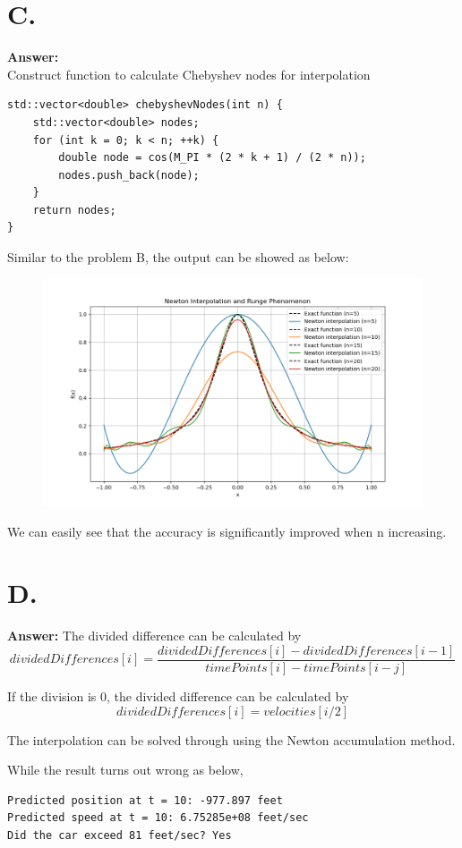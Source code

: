 \documentclass{article}
\begin{document}
\begin{CJK}{UTF8}{gbsn}
\section*{C.}
\textbf{Answer: }\\
Construct function to calculate Chebyshev nodes for interpolation
\begin{verbatim}
std::vector<double> chebyshevNodes(int n) {
    std::vector<double> nodes;
    for (int k = 0; k < n; ++k) {
        double node = cos(M_PI * (2 * k + 1) / (2 * n));
        nodes.push_back(node);
    }
    return nodes;
}
\end{verbatim}
Similar to the problem B, the output can be showed as below:
\begin{figure}[h!]
    \centering
    \includegraphics[width=1\linewidth]{Figure_2.png}
    \label{fig:enter-label}
\end{figure}
We can easily see that the accuracy is significantly improved when n increasing.


\section*{D.}

\textbf{Answer: }
The divided difference can be calculated by
$$
dividedDifferences[i] = \frac{
                    dividedDifferences[i] - dividedDifferences[i - 1]} { timePoints[i] - timePoints[i - j]}

$$


If the division is 0, the divided difference can be calculated by
$$
dividedDifferences[i] = velocities[i / 2]
$$


The interpolation can be solved through using the Newton accumulation method.\par
While the result turns out wrong as below,
\begin{verbatim}
Predicted position at t = 10: -977.897 feet
Predicted speed at t = 10: 6.75285e+08 feet/sec
Did the car exceed 81 feet/sec? Yes
\end{verbatim}



\end{CJK}
\end{document}
